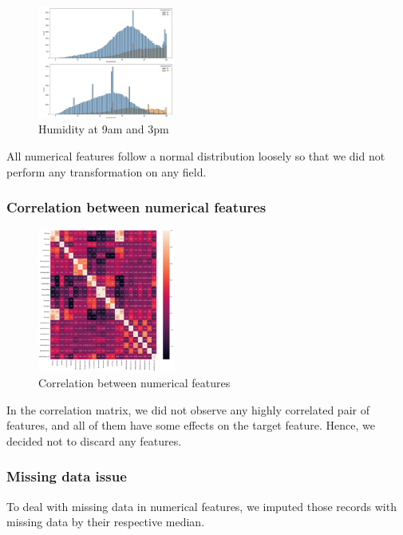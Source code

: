 \documentclass{article}
\begin{document}
\begin{figure}[h!]
\centering
\includegraphics[width=0.4\textwidth]{humidity.png}
\caption{Humidity at 9am and 3pm}
\label{fig:humidity}
\end{figure}

All numerical features follow a normal distribution loosely so that we did not perform any transformation on any field.

\subsubsection{Correlation between numerical features}

\begin{figure}[h!]
\centering
\includegraphics[width=0.4\textwidth]{correlation.png}
\caption{Correlation between numerical features}
\label{fig:humidity}
\end{figure}

In the correlation matrix, we did not observe any highly correlated pair of features, and all of them have some effects on the target feature. Hence, we decided not to discard any features.

\subsubsection{Missing data issue}

To deal with missing data in numerical features, we imputed those records with missing data by their respective median.
\end{document}
